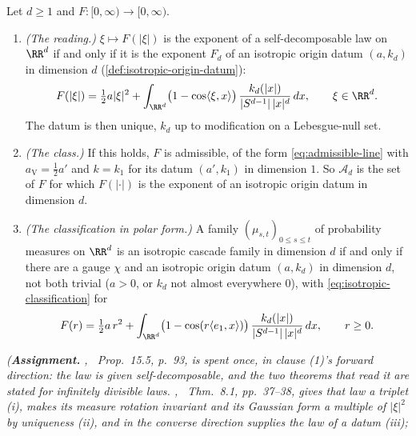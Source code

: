 \begin{proposition}
\label{prop:isotropic-polar-reading}
\leanok
Let $d \ge 1$ and $F : [0,\infty) \to [0,\infty)$.
\begin{enumerate}
\item \emph{(The reading.)} $\xi \mapsto F(|\xi|)$ is the exponent of a self-decomposable law on
$\RR^d$ if and only if it is the exponent $F_d$ of an isotropic origin datum $(a,k_d)$ in
dimension $d$ (\ref{def:isotropic-origin-datum}):
\[
  F(|\xi|) = \tfrac12 a|\xi|^2 + \int_{\RR^d}\bigl(1 - \cos\langle\xi,x\rangle\bigr)\,
    \frac{k_d(|x|)}{|S^{d-1}|\,|x|^d}\,dx , \qquad \xi \in \RR^d .
\]
The datum is then unique, $k_d$ up to modification on a Lebesgue-null set.
\item \emph{(The class.)} If this holds, $F$ is admissible, of the form
\ref{eq:admissible-line} with $a_{\mathrm V} = \tfrac12 a'$ and $k = k_1$ for its datum
$(a',k_1)$ in dimension $1$. So $\mathcal{A}_d$ is the set of $F$ for which $F(|\cdot|)$ is the
exponent of an isotropic origin datum in dimension $d$.
\item \emph{(The classification in polar form.)} A family $(\mu_{s,t})_{0 \le s \le t}$ of
probability measures on $\RR^d$ is an isotropic cascade family in dimension $d$ if and only if
there are a gauge $\chi$ and an isotropic origin datum $(a,k_d)$ in dimension $d$, not both trivial
($a > 0$, or $k_d$ not almost everywhere $0$), with \ref{eq:isotropic-classification} for
\[
  F(r) = \tfrac12 a\,r^2 + \int_{\RR^d}\bigl(1 - \cos(r\langle e_1,x\rangle)\bigr)\,
    \frac{k_d(|x|)}{|S^{d-1}|\,|x|^d}\,dx , \qquad r \ge 0 .
\]
\end{enumerate}
\statusA\quad{}\quad{}\quad{}\quad\emph{(\textbf{Assignment.}
, ~Prop.~15.5, p.~93, is spent once, in clause (1)'s forward
direction: the law is given self-decomposable, and the two theorems that read it are stated for
infinitely divisible laws. , ~Thm.~8.1, pp.~37--38, gives that law a
triplet (i), makes its \Levy{} measure rotation invariant and its Gaussian form a multiple of
$|\xi|^2$ by uniqueness (ii), and in the converse direction supplies the law of a datum (iii);
}
\end{proposition}
